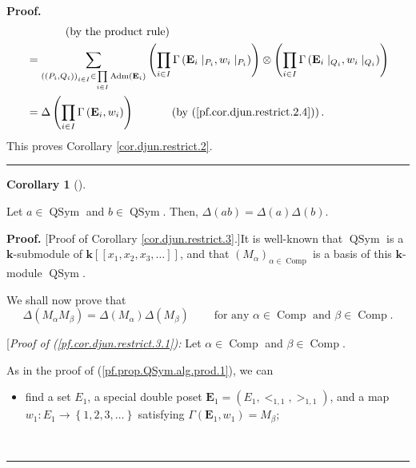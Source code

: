\documentclass[numbers=enddot,12pt,final,onecolumn,notitlepage,abstracton]{scrartcl}
\theoremstyle{definition}
\newtheorem{coro}[theo]{Corollary}
\newenvironment{corollary}[1][]
{\begin{coro}[#1]\begin{leftbar}}
{\end{leftbar}\end{coro}}
\newenvironment{proof}[1][Proof]{\noindent\textbf{#1.} }{\ \rule{0.5em}{0.5em}}
\let\sumnonlimits\sum
\let\prodnonlimits\prod
\renewcommand{\sum}{\sumnonlimits\limits}
\renewcommand{\prod}{\prodnonlimits\limits}
\newenvironment{verlong}{}{}
\begin{document}
\begin{verlong}
\begin{footnotesize}
\begin{proof}
\begin{align*}
&  \ \ \ \ \ \ \ \ \ \ \left(  \text{by the product rule}\right) \\
&  =\sum_{\left(  \left(  P_{i},Q_{i}\right)  \right)  _{i\in I}\in\prod_{i\in
I}\operatorname*{Adm}\left(  \mathbf{E}_{i}\right)  }\left(  \prod_{i\in
I}\Gamma\left(  \mathbf{E}_{i}\mid_{P_{i}},w_{i}\mid_{P_{i}}\right)  \right)
\otimes\left(  \prod_{i\in I}\Gamma\left(  \mathbf{E}_{i}\mid_{Q_{i}}%
,w_{i}\mid_{Q_{i}}\right)  \right) \\
&  =\Delta\left(  \prod_{i\in I}\Gamma\left(  \mathbf{E}_{i},w_{i}\right)
\right)  \ \ \ \ \ \ \ \ \ \ \left(  \text{by (\ref{pf.cor.djun.restrict.2.4}%
)}\right)  .
\end{align*}
This proves Corollary \ref{cor.djun.restrict.2}.
\end{proof}

\begin{corollary}
\label{cor.djun.restrict.3}Let $a\in\operatorname*{QSym}$ and $b\in
\operatorname*{QSym}$. Then, $\Delta\left(  ab\right)  =\Delta\left(
a\right)  \Delta\left(  b\right)  $.
\end{corollary}

\begin{proof}
[Proof of Corollary \ref{cor.djun.restrict.3}.]It is well-known that
$\operatorname*{QSym}$ is a $\mathbf{k}$-submodule of $\mathbf{k}\left[
\left[  x_{1},x_{2},x_{3},\ldots\right]  \right]  $, and that $\left(
M_{\alpha}\right)  _{\alpha\in{\operatorname{Comp}}}$ is a basis of this
$\mathbf{k}$-module $\operatorname*{QSym}$.

We shall now prove that
\begin{equation}
\Delta\left(  M_{\alpha}M_{\beta}\right)  =\Delta\left(  M_{\alpha}\right)
\Delta\left(  M_{\beta}\right)  \ \ \ \ \ \ \ \ \ \ \text{for any }\alpha
\in\operatorname*{Comp}\text{ and }\beta\in\operatorname*{Comp}.
\label{pf.cor.djun.restrict.3.1}%
\end{equation}


[\textit{Proof of (\ref{pf.cor.djun.restrict.3.1}):} Let $\alpha
\in\operatorname*{Comp}$ and $\beta\in\operatorname*{Comp}$.

As in the proof of (\ref{pf.prop.QSym.alg.prod.1}), we can

\begin{itemize}
\item find a set $E_{1}$, a special double poset $\mathbf{E}_{1}=\left(
E_{1},<_{1,1},>_{1,1}\right)  $, and a map $w_{1}:E_{1}\rightarrow\left\{
1,2,3,\ldots\right\}  $ satisfying $\Gamma\left(  {\mathbf{E}}_{1}%
,w_{1}\right)  =M_{\beta}$;


\end{itemize}
\end{proof}
\end{footnotesize}
\end{verlong}
\end{document}

